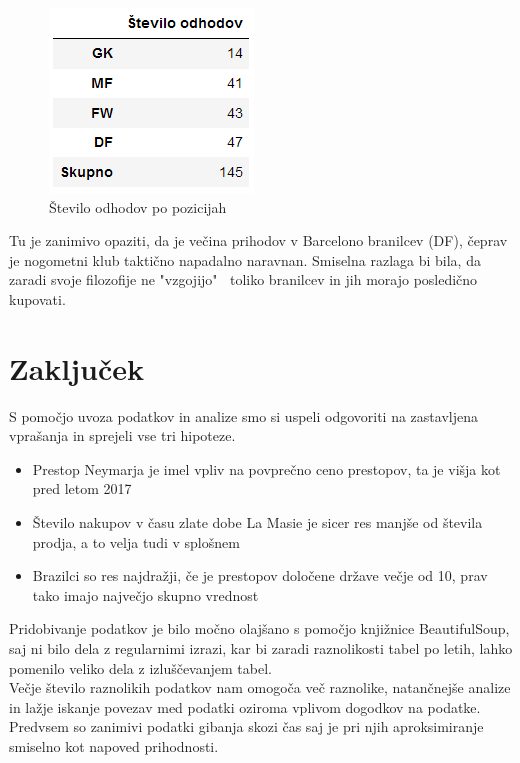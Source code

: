 \documentclass[a4paper, 12pt]{article}
\begin{document}
\begin{figure}[!htb]
\includegraphics[width=\linewidth]{tabela7}
\caption{Število odhodov po pozicijah}\label{fig:tabela7}
\endminipage\hfill
\end{figure}

Tu je zanimivo opaziti, da je večina prihodov v Barcelono branilcev (DF), čeprav je nogometni klub taktično napadalno naravnan. Smiselna razlaga bi bila, da zaradi svoje filozofije ne "vzgojijo" $\:$ toliko branilcev in jih morajo posledično kupovati.



\pagebreak

\section{Zaključek}
S pomočjo uvoza podatkov in analize smo si uspeli odgovoriti na zastavljena vprašanja in sprejeli vse tri hipoteze. 

\begin{itemize}
\item Prestop Neymarja je imel vpliv na povprečno ceno prestopov, ta je višja kot pred letom 2017
\item Število nakupov v času zlate dobe La Masie je sicer res manjše od števila prodja, a to velja tudi v splošnem
\item Brazilci so res najdražji, če je prestopov določene države večje od 10, prav tako imajo največjo skupno vrednost
\end{itemize}

Pridobivanje podatkov je bilo močno olajšano s pomočjo knjižnice BeautifulSoup, saj ni bilo dela z regularnimi izrazi, kar bi zaradi raznolikosti tabel po letih, lahko pomenilo veliko dela z izluščevanjem tabel.\\
Večje število raznolikih podatkov nam omogoča več raznolike, natančnejše analize in lažje iskanje povezav med podatki oziroma vplivom dogodkov na podatke. Predvsem so zanimivi podatki gibanja skozi čas saj je pri njih aproksimiranje smiselno kot napoved prihodnosti. \\


\end{document}
